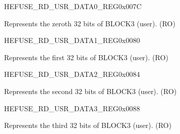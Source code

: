 \begin{register}{H}{EFUSE\_RD\_USR\_DATA0\_REG}{0x007C}\label{regdesc:EFUSERDUSRDATA0REG}
%
\regnewline%
\begin{regdesc}\begin{reglist}
\label{fielddesc:EFUSEUSRDATA0}\item [EFUSE\_USR\_DATA0] Represents the zeroth 32 bits of BLOCK3 (user). (RO)
\end{reglist}\end{regdesc}
\end{register}


\begin{register}{H}{EFUSE\_RD\_USR\_DATA1\_REG}{0x0080}\label{regdesc:EFUSERDUSRDATA1REG}
%
\regnewline%
\begin{regdesc}\begin{reglist}
\label{fielddesc:EFUSEUSRDATA1}\item [EFUSE\_USR\_DATA1] Represents the first 32 bits of BLOCK3 (user). (RO)
\end{reglist}\end{regdesc}
\end{register}


\begin{register}{H}{EFUSE\_RD\_USR\_DATA2\_REG}{0x0084}\label{regdesc:EFUSERDUSRDATA2REG}
%
\regnewline%
\begin{regdesc}\begin{reglist}
\label{fielddesc:EFUSEUSRDATA2}\item [EFUSE\_USR\_DATA2] Represents the second 32 bits of BLOCK3 (user). (RO)
\end{reglist}\end{regdesc}
\end{register}


\begin{register}{H}{EFUSE\_RD\_USR\_DATA3\_REG}{0x0088}\label{regdesc:EFUSERDUSRDATA3REG}
%
\regnewline%
\begin{regdesc}\begin{reglist}
\label{fielddesc:EFUSEUSRDATA3}\item [EFUSE\_USR\_DATA3] Represents the third 32 bits of BLOCK3 (user). (RO)
\end{reglist}\end{regdesc}
\end{register}


